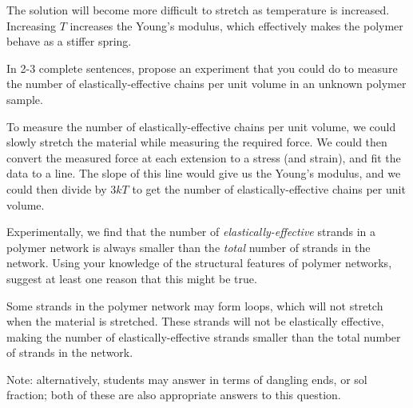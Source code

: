 \begin{activity}
\begin{ctqs}
		\begin{solution}[1.5in]
			The solution will become more difficult to stretch as temperature is increased.  Increasing $T$ increases the Young's modulus, which effectively makes the polymer behave as a stiffer spring.
		\end{solution}
	
	\question In 2-3 complete sentences, propose an experiment that you could do to measure the number of elastically-effective chains per unit volume in an unknown polymer sample.
	
		\begin{solution}[2in]
		
			To measure the number of elastically-effective chains per unit volume, we could slowly stretch the material while measuring the required force.  We could then convert the measured force at each extension to a stress (and strain), and fit the data to a line.  The slope of this line would give us the Young's modulus, and we could then divide by $3kT$ to get the number of elastically-effective chains per unit volume.
		
		\end{solution}
\end{ctqs}


\begin{exercises}

	\exercise Experimentally, we find that the number of \emph{elastically-effective} strands in a polymer network is always smaller than the \emph{total} number of strands in the network.  Using your knowledge of the structural features of polymer networks, suggest at least one reason that this might be true.
	
		\begin{solution}
			Some strands in the polymer network may form loops, which will not stretch when the material is stretched.  These strands will not be elastically effective, making the number of elastically-effective strands smaller than the total number of strands in the network.
			
			Note: alternatively, students may answer in terms of dangling ends, or sol fraction; both of these are also appropriate answers to this question.
		\end{solution}
	
	
	
	

\end{exercises}
\end{activity}
